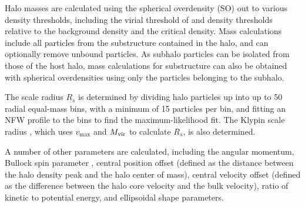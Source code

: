 Halo masses are calculated using the spherical overdensity (SO) out to various density thresholds, including the virial threshold of \cn and density thresholds relative to the background density and the critical density.  Mass calculations include all particles from the substructure contained in the halo, and can optionally remove unbound particles.  As subhalo particles can be isolated from those of the host halo, mass calculations for substructure can also be obtained with spherical overdensities using only the particles belonging to the subhalo.

The scale radius $R_{s}$ is determined by dividing halo particles up into up to 50 radial equal-mass bins, with a minimum of 15 particles per bin, and fitting an NFW profile to the bins to find the maximum-likelihood fit.  The Klypin scale radius \cn, which uses $v_{\max}$ and ${M_{\mathrm{vir}}}$ to calculate $R_{s}$, is also determined.

A number of other parameters are calculated, including the angular momentum, Bullock spin parameter \cn, central position offset (defined as the distance between the halo density peak and the halo center of mass), central velocity offset (defined as the difference between the halo core velocity and the bulk velocity), ratio of kinetic to potential energy, and ellipsoidal shape parameters.




